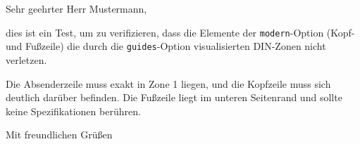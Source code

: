 \documentclass[modern, guides, footercenter]{../onlinebrief24}
\begin{document}
\begin{letter}{}
    \opening{Sehr geehrter Herr Mustermann,}
    
    dies ist ein Test, um zu verifizieren, dass die Elemente der \texttt{modern}-Option (Kopf- und Fußzeile) die durch die \texttt{guides}-Option visualisierten DIN-Zonen nicht verletzen.
    
    Die Absenderzeile muss exakt in Zone 1 liegen, und die Kopfzeile muss sich deutlich darüber befinden. Die Fußzeile liegt im unteren Seitenrand und sollte keine Spezifikationen berühren.
    
    \closing{Mit freundlichen Grüßen}
\end{letter}
\end{document}
